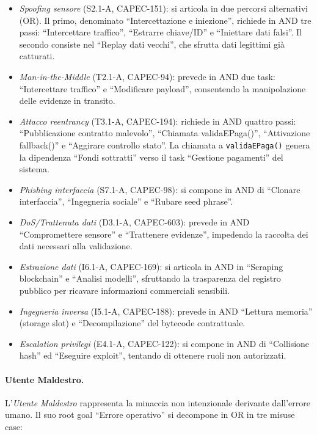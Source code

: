 \begin{itemize}
    \item \textit{Spoofing sensore} (S2.1-A, CAPEC-151): si articola in due percorsi alternativi (OR). Il primo, denominato ``Intercettazione e iniezione'', richiede in AND tre passi: ``Intercettare traffico'', ``Estrarre chiave/ID'' e ``Iniettare dati falsi''. Il secondo consiste nel ``Replay dati vecchi'', che sfrutta dati legittimi già catturati.
    \item \textit{Man-in-the-Middle} (T2.1-A, CAPEC-94): prevede in AND due task: ``Intercettare traffico'' e ``Modificare payload'', consentendo la manipolazione delle evidenze in transito.
    \item \textit{Attacco reentrancy} (T3.1-A, CAPEC-194): richiede in AND quattro passi: ``Pubblicazione contratto malevolo'', ``Chiamata validaEPaga()'', ``Attivazione fallback()'' e ``Aggirare controllo stato''. La chiamata a \texttt{validaEPaga()} genera la dipendenza ``Fondi sottratti'' verso il task ``Gestione pagamenti'' del sistema.
    \item \textit{Phishing interfaccia} (S7.1-A, CAPEC-98): si compone in AND di ``Clonare interfaccia'', ``Ingegneria sociale'' e ``Rubare seed phrase''.
    \item \textit{DoS/Trattenuta dati} (D3.1-A, CAPEC-603): prevede in AND ``Compromettere sensore'' e ``Trattenere evidenze'', impedendo la raccolta dei dati necessari alla validazione.
    \item \textit{Estrazione dati} (I6.1-A, CAPEC-169): si articola in AND in ``Scraping blockchain'' e ``Analisi modelli'', sfruttando la trasparenza del registro pubblico per ricavare informazioni commerciali sensibili.
    \item \textit{Ingegneria inversa} (I5.1-A, CAPEC-188): prevede in AND ``Lettura memoria'' (storage slot) e ``Decompilazione'' del bytecode contrattuale.
    \item \textit{Escalation privilegi} (E4.1-A, CAPEC-122): si compone in AND di ``Collisione hash'' ed ``Eseguire exploit'', tentando di ottenere ruoli non autorizzati.
\end{itemize}

\paragraph{Utente Maldestro.}
L'\textit{Utente Maldestro} rappresenta la minaccia non intenzionale derivante dall'errore umano. Il suo root goal ``Errore operativo'' si decompone in OR in tre misuse case:

